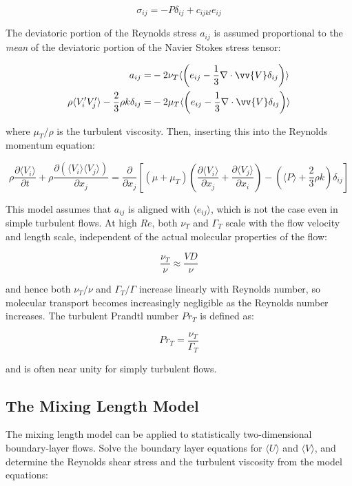 \documentclass[10pt]{article}
\newcommand{\beq}{\begin{equation}}
\newcommand{\eeq}{\end{equation}}
\newcommand{\beqa}{\begin{equation}\begin{aligned}}
\newcommand{\eeqa}{\end{aligned}\end{equation}}
\newcommand{\la}{\langle}
\newcommand{\ra}{\rangle}
\begin{document}
\begin{flushleft}
\beq
\sigma_{ij}=-P\delta_{ij}+c_{ijkl}e_{ij}
\eeq

The deviatoric portion of the Reynolds stress \(a_{ij}\) is assumed proportional to the \textit{mean} of the deviatoric portion of the Navier Stokes stress tensor:

\beqa
a_{ij}=&-2\nu_T\la\left(e_{ij}-\frac{1}{3}\nabla\cdot\vv{V}\delta_{ij}\right)\ra\\
\rho\la V_i'V_j'\ra-\frac{2}{3}\rho k\delta_{ij}=&-2\mu_T\la\left(e_{ij}-\frac{1}{3}\nabla\cdot\vv{V}\delta_{ij}\right)\ra\\
\eeqa

where \(\mu_T/\rho\) is the turbulent viscosity. Then, inserting this into the Reynolds momentum equation:

\beq
\label{eq:turbvisc}
\rho\frac{\partial \la V_i\ra}{\partial t}+\rho\frac{\partial(\la V_i\ra\la V_j\ra)}{\partial x_j}=\frac{\partial}{\partial x_j}\left\lbrack(\mu+\mu_T)\left(\frac{\partial\la V_i\ra}{\partial x_j}+\frac{\partial\la V_j\ra}{\partial x_i}\right)-\left(\la P\ra+\frac{2}{3}\rho k\right)\delta_{ij}\right\rbrack
\eeq

This model assumes that \(a_{ij}\) is aligned with \(\la e_{ij}\ra\), which is not the case even in simple turbulent flows. At high \(Re\), both \(\nu_T\) and \(\Gamma_T\) scale with the flow velocity and length scale, independent of the actual molecular properties of the flow:

\beq
\frac{\nu_T}{\nu}\approx\frac{VD}{\nu}
\eeq

and hence both \(\nu_T/\nu\) and \(\Gamma_T/\Gamma\) increase linearly with Reynolds number, so molecular transport becomes increasingly negligible as the Reynolds number increases. The turbulent Prandtl number \(Pr_T\) is defined as:

\beq
Pr_T=\frac{\nu_T}{\Gamma_T}
\eeq

and is often near unity for simply turbulent flows. 




\subsection{The Mixing Length Model}
The mixing length model can be applied to statistically two-dimensional boundary-layer flows. Solve the boundary layer equations for \(\la U\ra\) and \(\la V\ra\), and determine the Reynolds shear stress and the turbulent viscosity from the model equations:


\end{flushleft}
\end{document}
